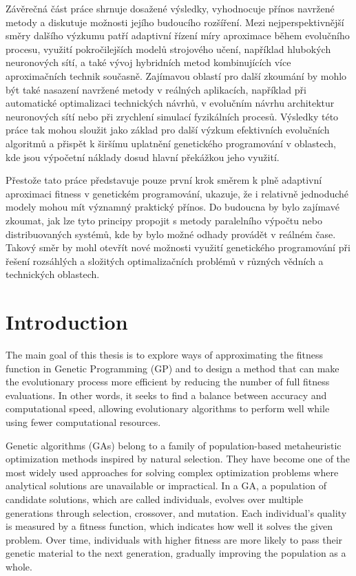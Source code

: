 \documentclass[12pt,a4paper]{report}
\begin{document}
\par Závěrečná část práce shrnuje dosažené výsledky, vyhodnocuje přínos navržené metody a diskutuje možnosti jejího budoucího rozšíření. Mezi nejperspektivnější směry dalšího výzkumu patří adaptivní řízení míry aproximace během evolučního procesu, využití pokročilejších modelů strojového učení, například hlubokých neuronových sítí, a také vývoj hybridních metod kombinujících více aproximačních technik současně. Zajímavou oblastí pro další zkoumání by mohlo být také nasazení navržené metody v reálných aplikacích, například při automatické optimalizaci technických návrhů, v evolučním návrhu architektur neuronových sítí nebo při zrychlení simulací fyzikálních procesů. Výsledky této práce tak mohou sloužit jako základ pro další výzkum efektivních evolučních algoritmů a přispět k širšímu uplatnění genetického programování v oblastech, kde jsou výpočetní náklady dosud hlavní překážkou jeho využití.  

\par Přestože tato práce představuje pouze první krok směrem k plně adaptivní aproximaci fitness v genetickém programování, ukazuje, že i relativně jednoduché modely mohou mít významný praktický přínos. Do budoucna by bylo zajímavé zkoumat, jak lze tyto principy propojit s metody paralelního výpočtu nebo distribuovaných systémů, kde by bylo možné odhady provádět v reálném čase. Takový směr by mohl otevřít nové možnosti využití genetického programování při řešení rozsáhlých a složitých optimalizačních problémů v různých vědních a technických oblastech.

\renewcommand{\contentsname}{Contents}
\tableofcontents
\cleardoublepage
{}

\chapter{Introduction}
\label{chap:introduction}

\par The main goal of this thesis is to explore ways of approximating the fitness function in Genetic Programming (GP) and to design a method that can make the evolutionary process more efficient by reducing the number of full fitness evaluations. In other words, it seeks to find a balance between accuracy and computational speed, allowing evolutionary algorithms to perform well while using fewer computational resources.

\par Genetic algorithms (GAs) belong to a family of population-based metaheuristic optimization methods inspired by natural selection. They have become one of the most widely used approaches for solving complex optimization problems where analytical solutions are unavailable or impractical. In a GA, a population of candidate solutions, which are called individuals, evolves over multiple generations through selection, crossover, and mutation. Each individual's quality is measured by a fitness function, which indicates how well it solves the given problem. Over time, individuals with higher fitness are more likely to pass their genetic material to the next generation, gradually improving the population as a whole.
\end{document}
